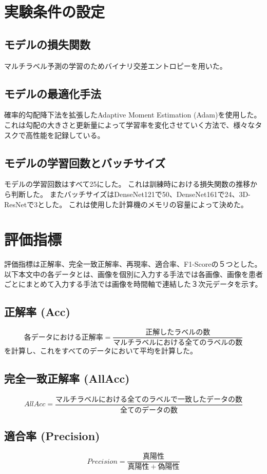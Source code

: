 \section{実験条件の設定}
\subsection{モデルの損失関数}
マルチラベル予測の学習のためバイナリ交差エントロピーを用いた。
\subsection{モデルの最適化手法}
確率的勾配降下法\cite{SGD}を拡張したAdaptive Moment Estimation (Adam)\cite{Adam}を使用した。
これは勾配の大きさと更新量によって学習率を変化させていく方法で、様々なタスクで高性能を記録している。
\subsection{モデルの学習回数とバッチサイズ}
モデルの学習回数はすべて25にした。
これは訓練時における損失関数の推移から判断した。
またバッチサイズはDenseNet121で50、DenseNet161で24、3D-ResNetで3とした。
これは使用した計算機のメモリの容量によって決めた。
\section{評価指標}
評価指標は正解率、完全一致正解率、再現率、適合率、F1-Scoreの５つとした。
以下本文中の各データとは、画像を個別に入力する手法では各画像、画像を患者ごとにまとめて入力する手法では画像を時間軸で連結した３次元データを示す。
\subsection{正解率 (Acc)}
\begin{equation}
各データにおける正解率 = \frac{正解したラベルの数}{マルチラベルにおける全てのラベルの数}
\end{equation}
を計算し、これをすべてのデータにおいて平均を計算した。
\subsection{完全一致正解率 (AllAcc)}
\begin{equation}
AllAcc=\frac{マルチラベルにおける全てのラベルで一致したデータの数}{全てのデータの数}
\end{equation}
\subsection{適合率 (Precision)}
\begin{equation}
Precision = \frac{真陽性}{真陽性+偽陽性}
\end{equation}

